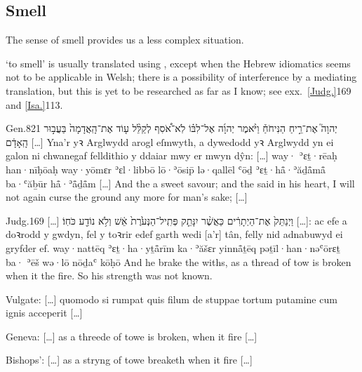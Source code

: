 \subsection{Smell}

\begin{paper}
	{\click} The sense of smell provides us a less complex situation.
\end{paper}




\begin{paper}
	 ‘to smell’ is usually translated using , except when the Hebrew idiomatics seems not to be applicable in Welsh; there is a possibility of interference by a mediating translation, but this is yet to be researched as far as I know; see exx.~\vref{Judg.}{16}{9}{} and \vref{Isa.}{11}{3}{}.
\end{paper}

\begin{example}{Gen.}{8}{21}{}{}
	\quoling
	{ יְהוָה֮ אֶת־רֵ֣יחַ הַנִּיחֹחַ֒ וַיֹּ֨אמֶר יְהוָ֜ה אֶל־לִבּ֗וֹ לֹֽא־אֹ֠סִף לְקַלֵּ֨ל ע֤וֹד אֶת־הָֽאֲדָמָה֙ בַּעֲב֣וּר הָֽאָדָ֔ם […]}
	{Yna’r  yꝛ Arglwydd arogl eſmwyth, a dywedodd yꝛ Arglwydd yn ei galon ni chwanegaf felldithio y ddaiar mwy er mwyn dŷn: […]}
	{way· {\YHWH} ʾɛṯ·rēaḥ han·nīḥōaḥ way·yōmɛr {\YHWH} ʾɛl·libbō lō·ʾōsip̄ lə·qallēl ʿōḏ ʾɛṯ·hå̄·ʾăḏå̄må̄ ba·ʿăḇūr hå̄·ʾå̄ḏå̄m […]}
	{And the {\LORD}  a sweet savour; and the {\LORD} said in his heart, I will not again curse the ground any more for man’s sake; […]}
\end{example}

\begin{example}{Judg.}{16}{9}{}{}
	\quoling
	{[…] וַיְנַתֵּק֙ אֶת־הַיְתָרִ֔ים כַּאֲשֶׁ֨ר יִנָּתֵ֤ק פְּתִֽיל־הַנְּעֹ֙רֶת֙  אֵ֔שׁ וְלֹ֥א נוֹדַ֖ע כֹּחֽוֹ׃}
	{[…]: ac efe a doꝛrodd y gwdyn, fel y toꝛrir edef garth wedi  [a’r] tân, felly nid adnabuwyd ei gryfder ef.}
	{way·nattēq ʾɛṯ·ha·yṯå̄rīm ka·ʾăšɛr yinnå̄ṯēq pəṯīl·han·nəʿōrɛṯ ba· ʾēš wə·lō nōḏaʿ kōḥō}
	{And he brake the withs, as a thread of tow is broken when it  the fire. So his strength was not known.}
\end{example}
\begin{compactdesc}\small
	\item [Vulgate:] […] quomodo si rumpat quis filum de stuppae tortum putamine cum  ignis acceperit […]
	\item [Geneva:] […] as a threede of towe is broken, when it  fire […]
	\item [Bishops’:] […] as a stryng of towe breaketh when it  fire […]
\end{compactdesc}

